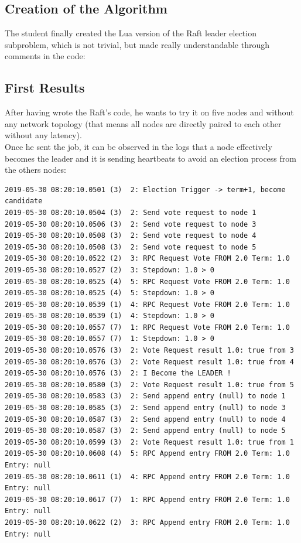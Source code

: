 \documentclass{eplmastersthesis}
\begin{document}
        \subsection{Creation of the Algorithm}

          The student finally created the Lua version of the Raft leader
          election subproblem, which is not trivial, but made really
          understandable through comments in the code:

          

        \subsection{First Results}

          After having wrote the Raft's code, he wants to try it on five nodes
          and without any network topology (that means all nodes are directly
          paired to each other without any latency).\\
          Once he sent the job, it can be observed in the logs that a node
          effectively becomes the leader and it is sending heartbeats to avoid
          an election process from the others nodes:

          \begin{lstlisting}[style=MyBash]
2019-05-30 08:20:10.0501 (3)  2: Election Trigger -> term+1, become candidate
2019-05-30 08:20:10.0504 (3)  2: Send vote request to node 1
2019-05-30 08:20:10.0506 (3)  2: Send vote request to node 3
2019-05-30 08:20:10.0508 (3)  2: Send vote request to node 4
2019-05-30 08:20:10.0508 (3)  2: Send vote request to node 5
2019-05-30 08:20:10.0522 (2)  3: RPC Request Vote FROM 2.0 Term: 1.0
2019-05-30 08:20:10.0527 (2)  3: Stepdown: 1.0 > 0
2019-05-30 08:20:10.0525 (4)  5: RPC Request Vote FROM 2.0 Term: 1.0
2019-05-30 08:20:10.0525 (4)  5: Stepdown: 1.0 > 0
2019-05-30 08:20:10.0539 (1)  4: RPC Request Vote FROM 2.0 Term: 1.0
2019-05-30 08:20:10.0539 (1)  4: Stepdown: 1.0 > 0
2019-05-30 08:20:10.0557 (7)  1: RPC Request Vote FROM 2.0 Term: 1.0
2019-05-30 08:20:10.0557 (7)  1: Stepdown: 1.0 > 0
2019-05-30 08:20:10.0576 (3)  2: Vote Request result 1.0: true from 3
2019-05-30 08:20:10.0576 (3)  2: Vote Request result 1.0: true from 4
2019-05-30 08:20:10.0576 (3)  2: I Become the LEADER !
2019-05-30 08:20:10.0580 (3)  2: Vote Request result 1.0: true from 5
2019-05-30 08:20:10.0583 (3)  2: Send append entry (null) to node 1
2019-05-30 08:20:10.0585 (3)  2: Send append entry (null) to node 3
2019-05-30 08:20:10.0587 (3)  2: Send append entry (null) to node 4
2019-05-30 08:20:10.0587 (3)  2: Send append entry (null) to node 5
2019-05-30 08:20:10.0599 (3)  2: Vote Request result 1.0: true from 1
2019-05-30 08:20:10.0608 (4)  5: RPC Append entry FROM 2.0 Term: 1.0 Entry: null
2019-05-30 08:20:10.0611 (1)  4: RPC Append entry FROM 2.0 Term: 1.0 Entry: null
2019-05-30 08:20:10.0617 (7)  1: RPC Append entry FROM 2.0 Term: 1.0 Entry: null
2019-05-30 08:20:10.0622 (2)  3: RPC Append entry FROM 2.0 Term: 1.0 Entry: null
          \end{lstlisting}
\end{document}
